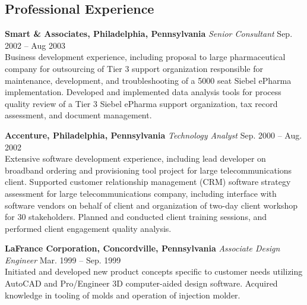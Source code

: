 \documentclass[line,a4paper]{resume}
\begin{document}
\begin{resume}
    \section{\mysidestyle Professional Experience}\vspace{3mm}
	\begin{minipage}{\textwidth}
	\textbf{Smart \& Associates, Philadelphia, Pennsylvania} \textsl{Senior Consultant} \hfill Sep. 2002 -- Aug 2003 \\%
	Business development experience, including proposal to large pharmaceutical company for outsourcing of Tier 3 support organization responsible for maintenance, development, and troubleshooting of a 5000 seat Siebel ePharma implementation. Developed and implemented data analysis tools for process quality review of a Tier 3 Siebel ePharma support organization, tax record assessment, and document management. \vspace{1mm}\\%
	\end{minipage}
	\begin{minipage}{\textwidth}
	\textbf{Accenture, Philadelphia, Pennsylvania} \textsl{Technology Analyst}  \hfill Sep. 2000 -- Aug. 2002 \\
    	Extensive software development experience, including lead developer on broadband ordering and provisioning tool project for large telecommunications client. Supported customer relationship management (CRM) software strategy assessment for large telecommunications company, including interface with software vendors on behalf of client and organization of two-day client workshop for 30 stakeholders. Planned and conducted client training sessions, and performed client engagement quality analysis. \vspace{1mm} \\
	\end{minipage}
	\begin{minipage}{\textwidth}
		\textbf{LaFrance Corporation, Concordville, Pennsylvania} \textsl{Associate Design Engineer} \hfill Mar. 1999 -- Sep. 1999 \\
    	Initiated and developed new product concepts specific to customer needs utilizing AutoCAD and Pro/Engineer 3D computer-aided design software. Acquired knowledge in tooling of molds and operation of injection molder. \vspace{1mm} \\
	\end{minipage}
	\begin{minipage}{\textwidth}

\end{minipage}
\end{resume}
\end{document}
